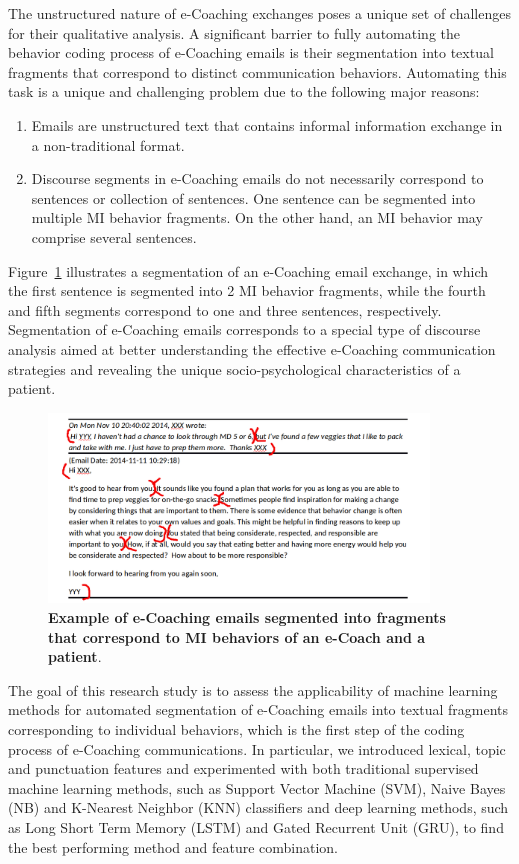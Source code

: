 \documentclass{amia}
\begin{document}
The unstructured nature of e-Coaching exchanges poses a unique set of challenges for their qualitative analysis. A significant barrier to fully automating the behavior coding process of e-Coaching emails is their segmentation into textual fragments that correspond to distinct communication behaviors. Automating this task is a unique and challenging problem due to the following major reasons:

\begin{enumerate}
\item Emails are unstructured text that contains informal information exchange in a non-traditional format.
\item Discourse segments in e-Coaching emails do not necessarily correspond to sentences or collection of sentences. One sentence can be segmented into multiple MI behavior fragments. On the other hand, an MI behavior may comprise several sentences.
\end{enumerate}

Figure~\ref{fig:text-segment} illustrates a segmentation of an e-Coaching email exchange, in which the first sentence is segmented into 2 MI behavior fragments, while the fourth and fifth segments correspond to one and three sentences, respectively. Segmentation of e-Coaching emails corresponds to a special type of discourse analysis \cite{webber2012discourse} aimed at better understanding the effective e-Coaching communication strategies and revealing the unique socio-psychological characteristics of a patient.

\begin{figure}[!htb]
    \centering
    \includegraphics[width=0.9\textwidth]{figures/segment-example.png}
    \caption{\textbf{Example of e-Coaching emails segmented into fragments that correspond to MI behaviors of an e-Coach and a patient}.}
    \label{fig:text-segment}
\end{figure}

The goal of this research study is to assess the applicability of machine learning methods for automated segmentation of e-Coaching emails into textual fragments corresponding to individual behaviors, which is the first step of the coding process of e-Coaching communications. In particular, we introduced lexical, topic and punctuation features and experimented with both traditional supervised machine learning methods, such as Support Vector Machine (SVM), Naive Bayes (NB) and K-Nearest Neighbor (KNN) classifiers and deep learning methods, such as Long Short Term Memory (LSTM) and Gated Recurrent Unit (GRU), to find the best performing method and feature combination. 
\end{document}
